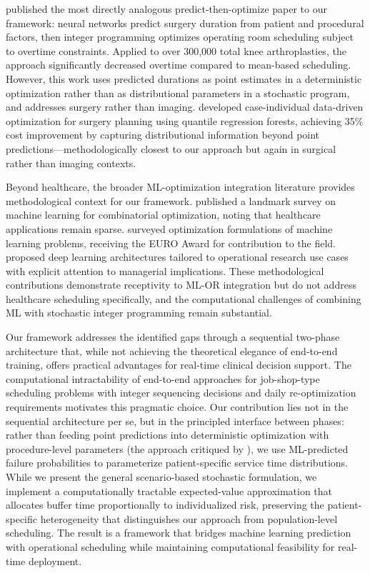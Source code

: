 \documentclass[11pt,a4paper]{article}
\begin{document}
\citet{gower2025predict} published the most directly analogous predict-then-optimize paper to our framework: neural networks predict surgery duration from patient and procedural factors, then integer programming optimizes operating room scheduling subject to overtime constraints. Applied to over 300,000 total knee arthroplasties, the approach significantly decreased overtime compared to mean-based scheduling. However, this work uses predicted durations as point estimates in a deterministic optimization rather than as distributional parameters in a stochastic program, and addresses surgery rather than imaging. \citet{alvarez2025case} developed case-individual data-driven optimization for surgery planning using quantile regression forests, achieving 35\% cost improvement by capturing distributional information beyond point predictions---methodologically closest to our approach but again in surgical rather than imaging contexts.

Beyond healthcare, the broader ML-optimization integration literature provides methodological context for our framework. \citet{bengio2021machine} published a landmark survey on machine learning for combinatorial optimization, noting that healthcare applications remain sparse. \citet{gambella2021optimization} surveyed optimization formulations of machine learning problems, receiving the EURO Award for contribution to the field. \citet{kraus2020deep} proposed deep learning architectures tailored to operational research use cases with explicit attention to managerial implications. These methodological contributions demonstrate receptivity to ML-OR integration but do not address healthcare scheduling specifically, and the computational challenges of combining ML with stochastic integer programming remain substantial.

Our framework addresses the identified gaps through a sequential two-phase architecture that, while not achieving the theoretical elegance of end-to-end training, offers practical advantages for real-time clinical decision support. The computational intractability of end-to-end approaches for job-shop-type scheduling problems with integer sequencing decisions and daily re-optimization requirements motivates this pragmatic choice. Our contribution lies not in the sequential architecture per se, but in the principled interface between phases: rather than feeding point predictions into deterministic optimization with procedure-level parameters (the approach critiqued by \citet{salah2022predict}), we use ML-predicted failure probabilities to parameterize patient-specific service time distributions. While we present the general scenario-based stochastic formulation, we implement a computationally tractable expected-value approximation that allocates buffer time proportionally to individualized risk, preserving the patient-specific heterogeneity that distinguishes our approach from population-level scheduling. The result is a framework that bridges machine learning prediction with operational scheduling while maintaining computational feasibility for real-time deployment.
\end{document}
